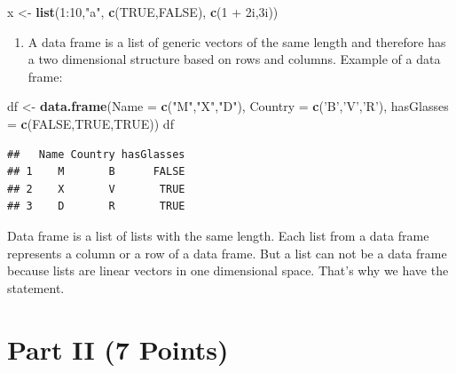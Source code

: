 \documentclass[12,]{article}
\newenvironment{Shaded}{\begin{snugshade}}{\end{snugshade}}
\newcommand{\KeywordTok}[1]{\textcolor[rgb]{0.13,0.29,0.53}{\textbf{{#1}}}}
\newcommand{\DataTypeTok}[1]{\textcolor[rgb]{0.13,0.29,0.53}{{#1}}}
\newcommand{\DecValTok}[1]{\textcolor[rgb]{0.00,0.00,0.81}{{#1}}}
\newcommand{\StringTok}[1]{\textcolor[rgb]{0.31,0.60,0.02}{{#1}}}
\newcommand{\OtherTok}[1]{\textcolor[rgb]{0.56,0.35,0.01}{{#1}}}
\newcommand{\NormalTok}[1]{{#1}}
\providecommand{\tightlist}{%
  \setlength{\itemsep}{0pt}\setlength{\parskip}{0pt}}
\begin{document}
\begin{Shaded}
\begin{Highlighting}[]
\NormalTok{x <-}\StringTok{ }\KeywordTok{list}\NormalTok{(}\DecValTok{1}\NormalTok{:}\DecValTok{10}\NormalTok{,}\StringTok{"a"}\NormalTok{, }\KeywordTok{c}\NormalTok{(}\OtherTok{TRUE}\NormalTok{,}\OtherTok{FALSE}\NormalTok{), }\KeywordTok{c}\NormalTok{(}\DecValTok{1} \NormalTok{+}\StringTok{ }\NormalTok{2i,3i))}
\end{Highlighting}
\end{Shaded}

\begin{enumerate}
\def\labelenumi{\arabic{enumi}.}
\setcounter{enumi}{2}
\tightlist
\item
  A data frame is a list of generic vectors of the same length and
  therefore has a two dimensional structure based on rows and columns.
  Example of a data frame:
\end{enumerate}

\begin{Shaded}
\begin{Highlighting}[]
\NormalTok{df <-}\StringTok{ }\KeywordTok{data.frame}\NormalTok{(}\DataTypeTok{Name =} \KeywordTok{c}\NormalTok{(}\StringTok{"M"}\NormalTok{,}\StringTok{"X"}\NormalTok{,}\StringTok{"D"}\NormalTok{), }
                 \DataTypeTok{Country =} \KeywordTok{c}\NormalTok{(}\StringTok{'B'}\NormalTok{,}\StringTok{'V'}\NormalTok{,}\StringTok{'R'}\NormalTok{), }
                 \DataTypeTok{hasGlasses =} \KeywordTok{c}\NormalTok{(}\OtherTok{FALSE}\NormalTok{,}\OtherTok{TRUE}\NormalTok{,}\OtherTok{TRUE}\NormalTok{))}
\NormalTok{df}
\end{Highlighting}
\end{Shaded}

\begin{verbatim}
##   Name Country hasGlasses
## 1    M       B      FALSE
## 2    X       V       TRUE
## 3    D       R       TRUE
\end{verbatim}

Data frame is a list of lists with the same length. Each list from a
data frame represents a column or a row of a data frame. But a list can
not be a data frame because lists are linear vectors in one dimensional
space. That's why we have the statement.

\section{Part II (7 Points)}\label{part-ii-7-points}
\end{document}
